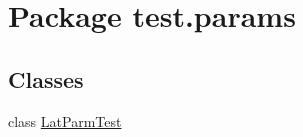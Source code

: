 \hypertarget{namespacetest_1_1params}{}\section{Package test.\+params}
\label{namespacetest_1_1params}
\subsection*{Classes}
\begin{DoxyCompactItemize}
\item 
class \hyperlink{classtest_1_1params_1_1_lat_parm_test}{Lat\+Parm\+Test}
\end{DoxyCompactItemize}
